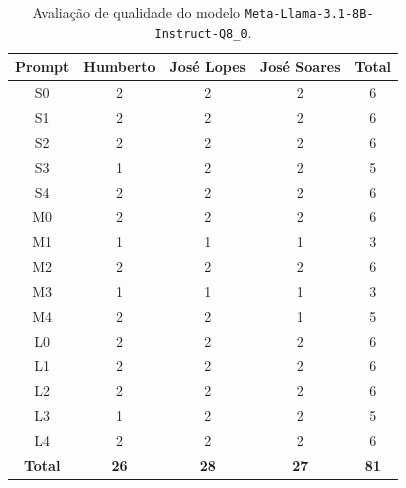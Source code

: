 \begin{table}[H]
    \centering
    \begin{tabular}{|c|c|c|c|c|}
        \hline
        \textbf{Prompt}      &
        \textbf{Humberto}    &
        \textbf{José Lopes}  &
        \textbf{José Soares} &
        \textbf{Total}       \\ \hline

        S0 & 2 & 2 & 2 & 6 \\ \hline
        S1 & 2 & 2 & 2 & 6 \\ \hline
        S2 & 2 & 2 & 2 & 6 \\ \hline
        S3 & 1 & 2 & 2 & 5 \\ \hline
        S4 & 2 & 2 & 2 & 6 \\ \hline
        M0 & 2 & 2 & 2 & 6 \\ \hline
        M1 & 1 & 1 & 1 & 3 \\ \hline
        M2 & 2 & 2 & 2 & 6 \\ \hline
        M3 & 1 & 1 & 1 & 3 \\ \hline
        M4 & 2 & 2 & 1 & 5 \\ \hline
        L0 & 2 & 2 & 2 & 6 \\ \hline
        L1 & 2 & 2 & 2 & 6 \\ \hline
        L2 & 2 & 2 & 2 & 6 \\ \hline
        L3 & 1 & 2 & 2 & 5 \\ \hline
        L4 & 2 & 2 & 2 & 6 \\ \hline
        \textbf{Total} & \textbf{26} & \textbf{28} & \textbf{27} & \textbf{81} \\ \hline
    \end{tabular}
    \caption{Avaliação de qualidade do modelo \texttt{Meta-Llama-3.1-8B-Instruct-Q8\_0}.}
\end{table}
